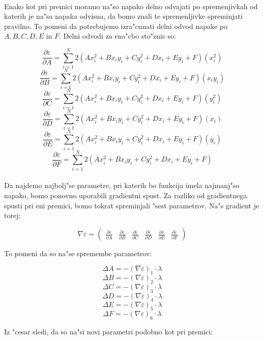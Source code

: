 \documentclass[a4paper, 12pt]{article}
\begin{document}
	\paragraph{}
	Enako kot pri premici moramo na"so napako delno odvajati po spremenjivkah od katerih je na"sa napaka odvisna, da bomo znali te spremenljivke spreminjati pravilno. To pomeni da potrebujemo izra"cunati delni odvod napake po $A, B, C, D, E$ in $F$. Delni odvodi za ena"cbo sto"znic so:

	$$\frac{\partial \varepsilon}{\partial A} = \sum_{i=1}^{N}2(Ax_i^2 + Bx_iy_i + Cy_i^2 + Dx_i + Ey_i + F)(x_i^2)$$
	$$\frac{\partial \varepsilon}{\partial B} = \sum_{i=1}^{N}2(Ax_i^2 + Bx_iy_i + Cy_i^2 + Dx_i + Ey_i + F)(x_iy_i)$$
	$$\frac{\partial \varepsilon}{\partial C} = \sum_{i=1}^{N}2(Ax_i^2 + Bx_iy_i + Cy_i^2 + Dx_i + Ey_i + F)(y_i^2)$$
	$$\frac{\partial \varepsilon}{\partial D} = \sum_{i=1}^{N}2(Ax_i^2 + Bx_iy_i + Cy_i^2 + Dx_i + Ey_i + F)(x_i)$$
	$$\frac{\partial \varepsilon}{\partial E} = \sum_{i=1}^{N}2(Ax_i^2 + Bx_iy_i + Cy_i^2 + Dx_i + Ey_i + F)(y_i)$$
	$$\frac{\partial \varepsilon}{\partial F} = \sum_{i=1}^{N}2(Ax_i^2 + Bx_iy_i + Cy_i^2 + Dx_i + Ey_i + F)$$

	\paragraph{}
	Da najdemo najbolj"se parametre, pri katerih bo funkcija imela najmanj"so napako, bomo ponovno uporabili gradientni spust. Za razliko od gradientnega spusti pri eni premici, bomo tokrat spreminjali "sest parametrov. Na"s gradient je torej:

	$$\nabla \varepsilon = \begin{pmatrix}
	\frac{\partial \varepsilon}{\partial A} &
	\frac{\partial \varepsilon}{\partial B} &
	\frac{\partial \varepsilon}{\partial C} &
	\frac{\partial \varepsilon}{\partial D} &
	\frac{\partial \varepsilon}{\partial E} &
	\frac{\partial \varepsilon}{\partial F}
	\end{pmatrix}$$

	To pomeni da so na"se spremembe parametrov:

	$$\Delta A = -(\nabla \varepsilon)_1 \cdot \lambda$$
	$$\Delta B = -(\nabla \varepsilon)_2 \cdot \lambda$$
	$$\Delta C = -(\nabla \varepsilon)_3 \cdot \lambda$$
	$$\Delta D = -(\nabla \varepsilon)_4 \cdot \lambda$$
	$$\Delta E = -(\nabla \varepsilon)_5 \cdot \lambda$$
	$$\Delta F = -(\nabla \varepsilon)_6 \cdot \lambda$$

	Iz "cesar sledi, da so na"si novi parametri podobno kot pri premici:
\end{document}
